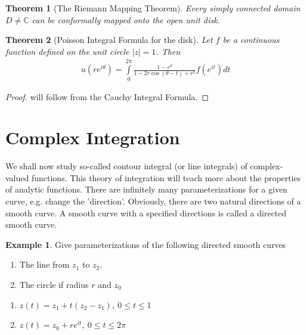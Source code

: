 \documentclass[12pt, a4paper]{article}
\theoremstyle{plain}
\newtheorem{thm}{Theorem} %
\theoremstyle{definition}
\newtheorem{example}{Example} %
\begin{document}
			\begin{thm}[The Riemann Mapping Theorem]
				Every simply connected domain $D\not= \mathbb{C}$ can be conformally mapped onto the open unit disk.\\
			\end{thm}

			\begin{thm}[Poisson Integral Formula for the disk]
				Let $f$ be a continuous function defined on the unit circle $|z|=1$. Then
				\begin{align*}
					u(re^{i\theta}) = \int\limits_{0}^{2\pi}\frac{1-r^2}{1-2r\cos(\theta-t)+r^2}f(e^{it})dt
				\end{align*}
			\end{thm}

			\begin{proof}
				will follow from the Cauchy Integral Formula.
			\end{proof}
	\section{Complex Integration} %
	\label{sec:complex_integration}
		We shall now study so-called contour integral (or line integrals) of complex-valued functions. This theory of integration will teach more about the properties of analytic functions. There are infinitely many parameterizations for a given curve, e.g. change the 'direction'. Obviously, there are two natural directions of a smooth curve. A smooth curve with a specified directions is called a directed smooth curve.\\

		\begin{example}
			Give parameterizations of the following directed smooth curves
			\begin{enumerate}[label=(\alph*)]
				\item The line from $z_1$ to $z_2$.
				\item The circle if radius $r$ and $z_0$
			\end{enumerate}

			\begin{enumerate}[label=(\alph*)]
				\item $z(t) = z_1 + t(z_2-z_1),\:0\le t \le 1$
				\item $z(t) = z_0 + re^{it},\: 0\le t\le 2\pi$\\
			\end{enumerate}
		\end{example}
\end{document}
